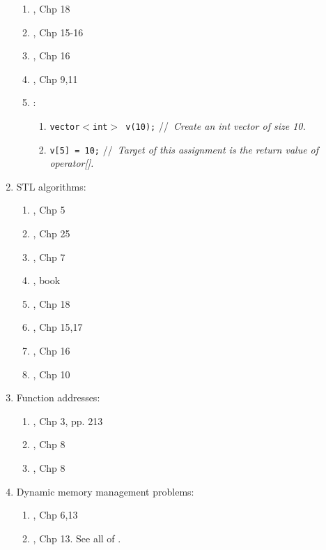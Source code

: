 \begin{enumerate}
\begin{enumerate}
	\item \cite{Allain2012}, Chp 18
	\item \cite{Gregoire2014}, Chp 15-16
	\item \cite{Prata2012}, Chp 16
	\item \cite{Lippman2013}, Chp 9,11
	\item \cite{EliteHussar2010}: \vspace{-0.2cm}
		\begin{enumerate} \itemsep -2pt
		\item {\tt vector$<$int$>$ v(10);} \hspace{0.2in} //{\it\ Create an int vector of size 10.}
		\item {\tt v[5] = 10;} //{\it\ Target of this assignment is the return value of operator[].}
		\end{enumerate}
	\end{enumerate}
\item STL algorithms: \vspace{-0.3cm}
	\begin{enumerate} \itemsep -2pt
	\item \cite{Eckel2003}, Chp 5
	\item \cite{Oualline2003}, Chp 25
	\item \cite{Vermeir2001}, Chp 7
	\item \cite{Reese2006a}, book
	\item \cite{Allain2012}, Chp 18
	\item \cite{Gregoire2014}, Chp 15,17
	\item \cite{Prata2012}, Chp 16
	\item \cite{Lippman2013}, Chp 10
	\end{enumerate}
\item Function addresses: \vspace{-0.3cm}
	\begin{enumerate} \itemsep -2pt
	\item \cite{Eckel2000}, Chp 3, pp. 213
	\item \cite{Stroustrup2014}, Chp 8
	\item \cite{Stroustrup2009}, Chp 8
	\end{enumerate}
\item Dynamic memory management problems: \vspace{-0.3cm}
	\begin{enumerate} \itemsep -2pt
	\item \cite{Eckel2000}, Chp 6,13
	\item \cite{Gaddis2010}, Chp 13. See all of \cite{Gaddis2010,Gaddis2011,Gaddis2012}.

\end{enumerate}
\end{enumerate}
